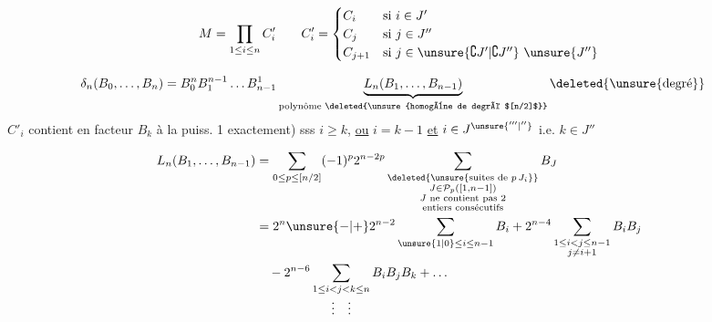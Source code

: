 
\[
M=\prod_{1\le i\le n}C'_i\qquad
C'_i=\begin{cases}
C_i&\text{si }i\in J'\\
C_j&\text{si }j\in J''\\
C_{j+1}&\text{si }j\in\unsure{\complement J'|\complement J''}\ \unsure{J''}
\end{cases}
\]

\[
\begin{aligned}
\delta_n(B_0,\ldots,B_{n})&=
 B_0^n B_1^{n-1}\ldots B_{n-1}^{1}\underbrace{L_n(B_1,\ldots,B_{n-1})}_{\text{polynôme \deleted{\unsure{homogène de degré $[n/2]$}}}}
 \deleted{\unsure{\text{degré}}}
\end{aligned}
\]
 $C'_i$ contient en facteur $B_k$  à la puiss. 1 exactement) sss  $i\ge k$, \uline{ou} $i=k-1$ \uline{et} $i\in J^{\unsure{'''|''}}$ i.e. $k\in J''$

\[
\begin{aligned}
L_n(B_1,\ldots,B_{n-1})
&=\sum_{0\le p\le[n/2]}(-1)^p2^{n-2p}
\sum_{\substack{\deleted{\unsure{\text{suites de }p\,J_i}}\\J\in\mathcal P_p([1,n-1])\\J\text{ ne contient pas 2}\\\text{entiers consécutifs}}} B_J\\
&=2^n\unsure{-|+}2^{n-2}\sum_{\unsure{1|0}\le i\le n-1}B_i
+2^{n-4}\sum_{\substack{1\le i<j\le n-1\\j\ne i+1}}B_iB_j\\
&\quad-2^{n-6}\sum_{\substack{1\le i<j<k\le n\\\vdots\quad\vdots}}B_iB_jB_k+\ldots
\end{aligned}
\]
